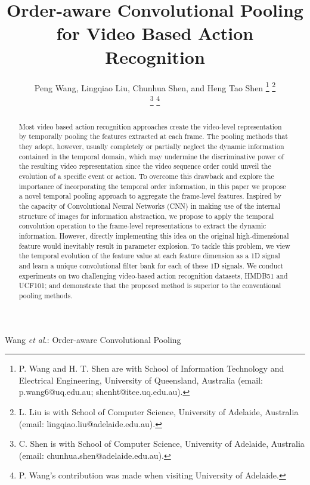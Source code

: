\documentclass[journal]{IEEEtran}
\begin{document}
\title{Order-aware Convolutional Pooling for Video Based Action Recognition}

\author{Peng Wang,
		Lingqiao Liu,
        Chunhua Shen,
        and Heng Tao Shen%
\thanks{P. Wang and H. T. Shen are with School of Information Technology and Electrical Engineering,  University of Queensland, Australia (email: p.wang6@uq.edu.au;
shenht@itee.uq.edu.au).}%
\thanks{L. Liu is with School of Computer Science, University of Adelaide, Australia (email: lingqiao.liu@adelaide.edu.au).}

\thanks{C. Shen is with School of Computer Science, University of Adelaide, Australia (email: chunhua.shen@adelaide.edu.au).}
\thanks{P. Wang's contribution was made when visiting University of Adelaide.}%
}







%
{Wang \MakeLowercase{\textit{et al.}}: Order-aware Convolutional Pooling}












\maketitle

\begin{abstract}


Most video based action recognition approaches create the video-level representation by temporally pooling the features extracted at each frame. The pooling methods that they adopt, however, usually completely or partially neglect the dynamic information contained in the temporal domain, which may undermine the discriminative power of the resulting video representation since the video sequence order could unveil the evolution of a specific event or action. To overcome this drawback and explore the importance of incorporating the temporal order information, in this paper we propose a novel temporal pooling approach to aggregate the frame-level features. Inspired by the capacity of Convolutional Neural Networks (CNN) in making use of the internal structure of images for information abstraction, we propose to apply the temporal convolution operation to the frame-level representations to extract the dynamic information. However, directly implementing this idea on the original high-dimensional feature would inevitably result in parameter explosion.
	To tackle this problem, we view the temporal evolution of the feature value at each feature dimension as a 1D signal and learn a unique convolutional filter bank for each of these 1D signals.  We conduct experiments on two challenging video-based action recognition datasets, HMDB51 and UCF101; and  demonstrate that the proposed method is superior to the conventional pooling methods.



\end{abstract}
\end{document}
